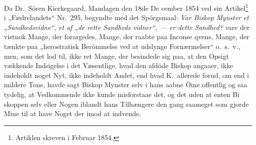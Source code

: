 \documentclass[12pt,a4paper]{article}
\newcommand{\opage}[1]{\marginnote{\footnotesize\textit{[#1]}}}
\begin{document}
Da Dr.\ Sören Kierkegaard, Mandagen den 18de De\-%
cember 1854 ved sin Artikel\footnote{Artiklen skreven i Februar 1854.} i „Fædrelandets“ Nr.\ 295,
begyndte med det Spörgsmaal: \emph{Var Biskop Mynster
et „Sandhedsvidne“, et af „de rette Sandheds\-%
vidner“, --- er dette Sandhed?} vare der vistnok
Mange, der forargedes, Mange, der raabte paa Inconse\-%
qvens, Mange, der tænkte paa „herostratisk Berömmelse
ved at udslynge Fornærmelser“ o.\ s.\ v., men, som det
\opage{18} lod til, ikke ret Mange, der besindede sig paa, at den
Opsigt vækkende Indsigelse i det Væsentlige, hvad den
afdöde Biskop angaaer, ikke indeholdt noget Nyt, ikke
indeholdt Andet, end hvad K.\ allerede forud, om end i
mildere Tone, havde sagt Biskop Mynster selv i hans
aabne Öine offentlig og saa tydelig, at Vedkommende
ikke kunde misforstaae det, og det uden at enten Bi\-%
skoppen selv eller Nogen iblandt hans Tilhængere den\-%
gang saameget som gjorde Mine til at have Noget der\-%
imod at indvende.
\end{document}
